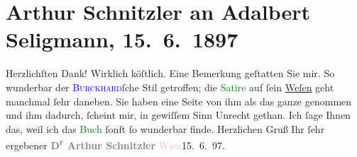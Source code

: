

               \section[Arthur Schnitzler an Adalbert Seligmann, 15. 6. 1897]{ Arthur Schnitzler an Adalbert Seligmann,
                    15. 6. 1897}\nopagebreak{}\rehead{ }\normalsize\beginnumbering{} \toendnotes[C]{\smallbreak\pagebreak[2]} 
\toendnotes[C]{\smallbreak}\pstart
           \noindent{}{\pb}Herzlichſten Dank! Wirklich köſtlich.
                    Eine Bemerkung geſtatten Sie mir. So wunderbar der \textcolor{blue}{\textsc{Burckhard}}{}\ledrightnote{\textcolor{blue}{Max Eugen Burckhard}}ſche Stil getroffen;
                    die \textcolor{green}{Satire}{} auf ſein \uline{Weſen} geht manchmal ſehr daneben. Sie haben eine
                    Seite von ihm als das ganze genommen und ihm dadurch, ſcheint mir, in gewiſſem
                    Sinn Unrecht gethan. {\pb}Ich ſage Ihnen
                    das, weil ich das \textcolor{green}{Buch}{} ſonſt
                    ſo wunderbar finde.\pend
           \pstart Herzlichen Gruß Ihr ſehr ergebener\pend{}\pstart
           \centering{}\textcolor{gray}{\textbf{D\textsuperscript{r} Arthur
                        Schnitzler}}\pend
           \pstart
           \textcolor{pink}{Wien}{}\ledrightnote{\textcolor{pink}{Wien}}{ }15. 6. 97.\pend
           \endnumbering{}  
      